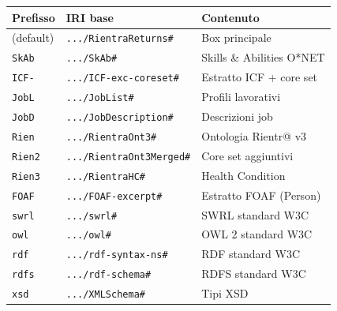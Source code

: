 \documentclass[a4paper,12pt]{article}
\begin{document}
\begin{longtable}{L{2.3cm} L{7.5cm} L{2.7cm}}
  \toprule
  \textbf{Prefisso} & \textbf{IRI base} & \textbf{Contenuto} \\
  \midrule
  \endhead
  (default) & {\scriptsize\texttt{.../RientraReturns\#}} & Box principale \\
  \texttt{SkAb} & {\scriptsize\texttt{.../SkAb\#}} & Skills \& Abilities O*NET \\
  \texttt{ICF-} & {\scriptsize\texttt{.../ICF-exc-coreset\#}} & Estratto ICF + core set \\
  \texttt{JobL} & {\scriptsize\texttt{.../JobList\#}} & Profili lavorativi \\
  \texttt{JobD} & {\scriptsize\texttt{.../JobDescription\#}} & Descrizioni job \\
  \texttt{Rien} & {\scriptsize\texttt{.../RientraOnt3\#}} & Ontologia Rientr@ v3 \\
  \texttt{Rien2} & {\scriptsize\texttt{.../RientraOnt3Merged\#}} & Core set aggiuntivi \\
  \texttt{Rien3} & {\scriptsize\texttt{.../RientraHC\#}} & Health Condition \\
  \texttt{FOAF} & {\scriptsize\texttt{.../FOAF-excerpt\#}} & Estratto FOAF (Person) \\
  \texttt{swrl} & {\scriptsize\texttt{.../swrl\#}} & SWRL standard W3C \\
  \texttt{owl} & {\scriptsize\texttt{.../owl\#}} & OWL 2 standard W3C \\
  \texttt{rdf} & {\scriptsize\texttt{.../rdf-syntax-ns\#}} & RDF standard W3C \\
  \texttt{rdfs} & {\scriptsize\texttt{.../rdf-schema\#}} & RDFS standard W3C \\
  \texttt{xsd} & {\scriptsize\texttt{.../XMLSchema\#}} & Tipi XSD \\
  \bottomrule
\end{longtable}
\end{document}
